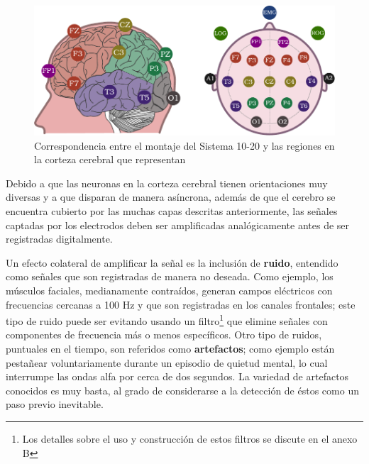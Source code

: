 \begin{figure}
\centering
\includegraphics[width=\linewidth]{./img_diagramas/cerebro_1020_v2.pdf} 
\caption{Correspondencia entre el montaje del Sistema 10-20 y las regiones en la corteza cerebral 
que representan
}
\label{corresponde_1020}
\end{figure}

Debido a que las neuronas en la corteza cerebral tienen orientaciones muy diversas y a que disparan 
de manera asíncrona, además de que el cerebro se encuentra cubierto por las muchas capas descritas
anteriormente, las señales captadas por los electrodos deben ser amplificadas analógicamente antes 
de ser registradas digitalmente.
%
%

Un efecto colateral de amplificar la señal es la inclusión de \textbf{ruido}, entendido como 
señales que son registradas de manera no deseada.
Como ejemplo, los músculos faciales, medianamente contraídos, generan campos eléctricos con
frecuencias cercanas a 100 Hz y que son registradas en los canales frontales;
este tipo de ruido puede ser evitando usando un filtro\footnote{Los detalles sobre el uso y
construcción de estos filtros se discute en el anexo B} que elimine señales con componentes de
frecuencia más o menos específicos.
Otro tipo de ruidos, puntuales en el tiempo, son referidos como \textbf{artefactos}; como ejemplo
están pestañear voluntariamente durante un episodio de quietud mental, lo cual interrumpe las ondas 
alfa por cerca de dos segundos.
La variedad de artefactos conocidos es muy basta, al grado de
considerarse a la detección de éstos como un paso previo inevitable.


